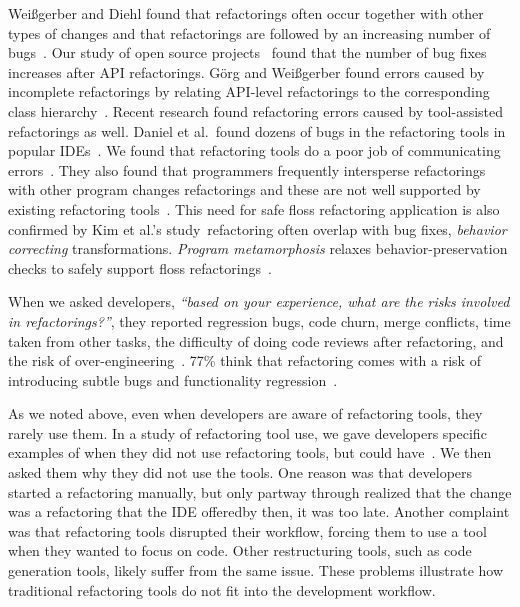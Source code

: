 \documentclass[runningheads,a4paper]{llncs}
\begin{document}
 Wei{\ss}gerber and Diehl found that refactorings often occur together with other types of changes and that refactorings are followed by an increasing number of bugs~\cite{Weissgerber2006:refactor}. Our study of open source projects~\cite{Kim2011:refactorbug} found that the number of bug fixes increases after API refactorings. G{\"o}rg and Wei{\ss}gerber found errors caused by incomplete refactorings by relating API-level refactorings to the corresponding class hierarchy~\cite{Weissgerber2006:refactor}. Recent research found refactoring errors caused by tool-assisted refactorings as well. Daniel et al.~found dozens of bugs in the refactoring tools in popular IDEs~\cite{Brett2007:reftest}. We found that refactoring tools do a poor job of communicating errors~\cite{Murphy-Hill2009:refactor}. They also found that programmers frequently intersperse refactorings with other program changes refactorings and these are not well supported by existing refactoring tools~\cite{Murphy-Hill2009:refactor}. This need for safe {floss} refactoring application is also confirmed by Kim et al.'s study~\cite{Kim2011:refactorbug}\textemdash refactoring often overlap with bug fixes, {\em behavior correcting} transformations. {\em Program metamorphosis} relaxes behavior-preservation checks to safely support floss refactorings~\cite{Reichenbach2009:pm}.

When we asked developers, {\it ``based on your experience, what are the risks involved in refactorings?''}, they reported regression bugs, code churn, merge conflicts, time taken from other tasks, the difficulty of doing code reviews after refactoring, and the risk of over-engineering~\cite{Kim2012:fieldrefactoring}. 77\% think that refactoring comes with a risk of introducing subtle bugs and functionality regression~\cite{Kim2012:fieldrefactoring}.

As we noted above, even when developers are aware of refactoring tools, they rarely use them.  In a study of refactoring tool use, we gave developers specific examples of when they did not use refactoring tools, but could have~\cite{Murphy-Hill2009:refactor}. We then asked them why they did not use the tools.  One reason was that developers started a refactoring manually, but only partway through realized that the change was a refactoring that the IDE offered\textemdash by then, it was too late.  Another complaint was that refactoring tools disrupted their workflow, forcing them to use a tool when they wanted to focus on code.  Other restructuring tools, such as code generation tools, likely suffer from the same issue.  These problems illustrate how traditional refactoring tools do not fit into the development workflow.
\end{document}
